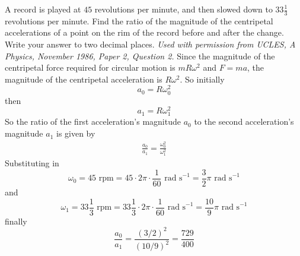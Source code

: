 
\begin{problem}
{A record is played at $45$ revolutions per minute, and then slowed down to $33\frac{1}{3}$ revolutions per minute. Find the ratio of the magnitude of the centripetal accelerations of a point on the rim of the record before and after the change. Write your answer to two decimal places.
} 
{\textit{Used with permission from UCLES, A Physics, November 1986, Paper 2, Question 2.}}
{Since the magnitude of the centripetal force required for circular motion is $mR\omega^2$ and $F=ma$, the magnitude of the centripetal acceleration is $R\omega^2$. So initially
\begin{equation*} a_0=R\omega_0^2 \end{equation*}
then 
\begin{equation*} a_1=R\omega_1^2 \end{equation*}
So the ratio of the first acceleration's magnitude $a_0$ to the second acceleration's magnitude $a_1$ is given by 
\begin{align*} \frac{a_0}{a_1}=\frac{\omega_0^2}{\omega_1^2} \end{align*}
Substituting in 
\begin{equation*}
\omega_0=45\textrm{ rpm}=45\cdot2\pi\cdot\frac{1}{60}\textrm{ rad s}^{-1}=\frac{3}{2}\pi\textrm{ rad s}^{-1}
\end{equation*} and
\begin{equation*}
\omega_1=33\frac{1}{3}\textrm{ rpm}=33\frac{1}{3}\cdot2\pi\cdot\frac{1}{60}\textrm{ rad s}^{-1}=\frac{10}{9}\pi\textrm{ rad s}^{-1}
\end{equation*}
finally
\begin{equation*} \frac{a_0}{a_1}=\frac{(3/2)^2}{(10/9)^2}=\frac{729}{400} \end{equation*}
}
\end{problem}